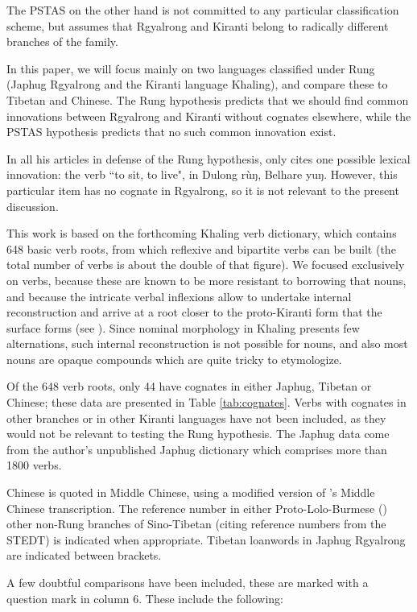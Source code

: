 \documentclass[oldfontcommands,oneside,a4paper,11pt]{article}
\newcommand{\ipa}[1]{{\phon #1}} %
\begin{document}
The PSTAS on the other hand is not committed to any particular classification scheme, but assumes that Rgyalrong and Kiranti belong to radically different branches of the family.

In this paper, we will focus mainly on two languages classified under Rung (Japhug Rgyalrong and the Kiranti language Khaling), and compare these to Tibetan and Chinese. The Rung hypothesis predicts that we should find common innovations between Rgyalrong and Kiranti without cognates elsewhere, while the PSTAS hypothesis predicts that no such common innovation exist.

In all his articles in defense of the Rung hypothesis, \citet{lapolla14subgrouping} only cites one possible lexical innovation: the verb ``to sit, to live", in Dulong \ipa{rùŋ}, Belhare \ipa{yuŋ}. However, this particular item has no cognate in Rgyalrong, so it is not relevant to the present discussion.

This work is based on the forthcoming Khaling verb dictionary, which contains 648 basic verb roots, from which reflexive and bipartite verbs can be built (the total number of verbs is about the double of that figure). We focused exclusively on verbs, because these are known to be more resistant to borrowing that nouns, and because the intricate verbal inflexions allow to undertake internal reconstruction and arrive at a root closer to the proto-Kiranti form that the surface forms (see \citealt{jacques12khaling}). Since nominal morphology in Khaling presents few alternations, such internal reconstruction is not possible for nouns, and also most nouns are opaque compounds which are quite tricky to etymologize.

Of the 648 verb roots, only 44 have cognates in either Japhug, Tibetan or Chinese; these data are presented in Table \ref{tab:cognates}. Verbs with cognates in other branches or in other Kiranti languages have not been included, as they would not be relevant to testing the Rung hypothesis. The Japhug data come from the author's unpublished Japhug dictionary which comprises more than 1800 verbs.

Chinese is quoted in Middle Chinese, using a modified version of \citet{baxter92}'s Middle Chinese transcription. 
The reference number in either Proto-Lolo-Burmese (\citealt{bradley79}) other non-Rung branches of Sino-Tibetan (citing reference numbers from the STEDT) is indicated when appropriate. Tibetan loanwords in Japhug Rgyalrong are indicated between brackets.

A few doubtful comparisons have been included, these are marked with a question mark in column 6. These include the following:
\end{document}
